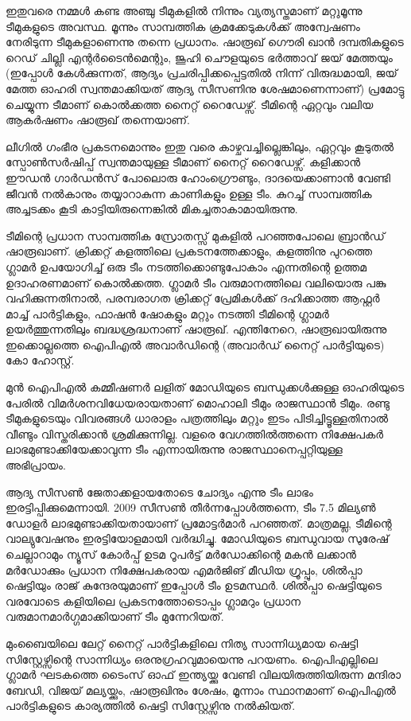 ഇതുവരെ നമ്മള്‍ കണ്ട അഞ്ചു ടീമുകളില്‍ നിന്നും വ്യത്യസ്തമാണ് മറ്റുമൂന്നു ടീമുകളുടെ അവസ്ഥ. മൂന്നും സാമ്പത്തിക 
ക്രമക്കേടുകള്‍ക്ക് അന്വേഷണം നേരിടുന്ന ടീമുകളാണെന്നു തന്നെ പ്രധാനം. ഷാരൂഖ് ഗൌരി ഖാന്‍ ദമ്പതികളുടെ റെഡ് 
ചില്ലി എന്റര്‍ടൈന്‍മെന്റും, ജൂഹി ചൌളയുടെ ഭര്‍ത്താവ് ജയ് മേത്തയും (ഇപ്പോള്‍ കേള്‍ക്കുന്നത്, ആദ്യം പ്രചരിപ്പിക്കപ്പെട്ടതില്‍ 
നിന്ന് വിരുദ്ധമായി, ജയ് മേത്ത ഓഹരി സ്വന്തമാക്കിയത് ആദ്യ സീസണിനു ശേഷമാണെന്നാണ്) പ്രമോട്ടു ചെയ്യുന്ന ടീമാണ് 
കൊല്‍ക്കത്ത നൈറ്റ് റൈഡേഴ്സ്. ടീമിന്റെ ഏറ്റവും വലിയ ആകര്‍ഷണം ഷാരൂഖ് തന്നെയാണ്.

ലീഗില്‍ ഗംഭീര പ്രകടനമൊന്നും ഇതു വരെ കാഴ്ചവച്ചില്ലെങ്കിലും, ഏറ്റവും കൂടുതല്‍ സ്പോണ്‍സര്‍ഷിപ്പ് സ്വന്തമായുള്ള ടീമാണ് 
നൈറ്റ് റൈഡേഴ്സ്. കളിക്കാന്‍ ഈഡന്‍ ഗാര്‍ഡന്‍സ് പോലൊരു ഹോംഗ്രൌണ്ടും, ദാദയെക്കാണാന്‍ വേണ്ടി ജീവന്‍ 
നല്‍കാനും തയ്യാറാകുന്ന കാണികളും ഉള്ള ടീം. കുറച്ച് സാമ്പത്തിക അച്ചടക്കം കൂടി കാട്ടിയിരുന്നെങ്കില്‍ മികച്ചതാകാമായിരുന്നു.

ടീമിന്റെ പ്രധാന സാമ്പത്തിക സ്രോതസ്സ് മുകളില്‍ പറഞ്ഞപോലെ ബ്രാന്‍ഡ് ഷാരൂഖാണ്. ക്രിക്കറ്റ് കളത്തിലെ 
പ്രകടനത്തേക്കാളും, കളത്തിനു പുറത്തെ ഗ്ലാമര്‍ ഉപയോഗിച്ച് ഒരു ടീം നടത്തിക്കൊണ്ടുപോകാം എന്നതിന്റെ ഉത്തമ 
ഉദാഹരണമാണ് കൊല്‍ക്കത്ത. ഗ്ലാമര്‍ ടീം വരുമാനത്തിലെ വലിയൊരു പങ്കു വഹിക്കുന്നതിനാല്‍, പരമ്പരാഗത ക്രിക്കറ്റ് 
പ്രേമികള്‍ക്ക് ദഹിക്കാത്ത ആഫ്റ്റര്‍ മാച്ച് പാര്‍ട്ടികളും, ഫാഷന്‍ ഷോകളും മറ്റും നടത്തി ടീമിന്റെ ഗ്ലാമര്‍ ഉയര്‍ത്തുന്നതിലും 
ബദ്ധശ്രദ്ധനാണ് ഷാരൂഖ്. എന്തിനേറെ, ഷാരൂഖായിരുന്നു ഇക്കൊല്ലത്തെ ഐപിഎല്‍ അവാര്‍ഡിന്റെ (അവാര്‍ഡ് 
നൈറ്റ് പാര്‍ട്ടിയുടെ) കോ ഹോസ്റ്റ്.

മുന്‍ ഐപിഎല്‍ കമ്മീഷണര്‍ ലളിത് മോഡിയുടെ ബന്ധുക്കള്‍ക്കുള്ള ഓഹരിയുടെ പേരില്‍ വിമര്‍ശനവിധേയരായതാണ് 
മൊഹാലി ടീമും രാജസ്ഥാന്‍ ടീമും. രണ്ടു ടീമുകളുടെയും വിവരങ്ങള്‍ ധാരാളം പത്രത്തിലും മറ്റും ഇടം പിടിച്ചിട്ടൂള്ളതിനാല്‍ വീണ്ടും 
വിസ്തരിക്കാന്‍ ശ്രമിക്കുന്നില്ല. വളരെ വേഗത്തില്‍ത്തന്നെ നിക്ഷേപകര്‍ ലാഭമുണ്ടാക്കിയേക്കാവുന്ന ടീം എന്നായിരുന്നു 
രാജസ്ഥാനെപ്പറ്റിയുള്ള അഭിപ്രായം.

ആദ്യ സീസണ്‍ ജേതാക്കളായതോടെ ചോദ്യം എന്നു ടീം ലാഭം ഇരട്ടിപ്പിക്കുമെന്നായി. 2009 സീസണ്‍ തീര്‍ന്നപ്പോള്‍ത്തന്നെ, 
ടീം 7.5 മില്യണ്‍ ഡോളര്‍ ലാഭമുണ്ടാക്കിയതായാണ് പ്രമോട്ടര്‍മാര്‍ പറഞ്ഞത്. മാത്രമല്ല, ടീമിന്റെ വാല്യുവേഷനും ഇരട്ടിയോളമായി 
വര്‍ദ്ധിച്ചു. മോഡിയുടെ ബന്ധുവായ സുരേഷ് ചെല്ലാറാമും ന്യൂസ് കോര്‍പ്പ് ഉടമ റൂപര്‍ട്ട് മര്‍ഡോക്കിന്റെ മകന്‍ ലക്കാന്‍ 
മര്‍ഡോക്കും പ്രധാന നിക്ഷേപകരായ എമര്‍ജിങ് മീഡിയ ഗ്രൂപ്പും, ശില്‍പ്പാ ഷെട്ടിയും രാജ് കുന്ദേരയുമാണ് ഇപ്പോള്‍ ടീം 
ഉടമസ്ഥര്‍. ശില്‍പ്പാ ഷെട്ടിയുടെ വരവോടെ കളിയിലെ പ്രകടനത്തോടൊപ്പം ഗ്ലാമറും പ്രധാന വരുമാനമാര്‍ഗ്ഗമാക്കിയാണ് 
ടീം മുന്നേറിയത്.

മുംബൈയിലെ ലേറ്റ് നൈറ്റ് പാര്‍ട്ടികളിലെ നിത്യ സാന്നിധ്യമായ ഷെട്ടി സിസ്റ്റേഴ്സിന്റെ സാന്നിധ്യം ഒരനുഗ്രഹവുമായെന്നു 
പറയണം. ഐപിഎല്ലിലെ ഗ്ലാമര്‍ ഘടകത്തെ ടൈംസ് ഓഫ് ഇന്ത്യയ്ക്കു വേണ്ടി വിലയിരുത്തിയിരുന്ന മന്ദിരാ ബേഡി, 
വിജയ് മല്യയ്ക്കും, ഷാരൂഖിനും ശേഷം, മൂന്നാം സ്ഥാനമാണ് ഐപിഎല്‍ പാര്‍ട്ടികളുടെ കാര്യത്തില്‍ ഷെട്ടി സിസ്റ്റേഴ്സിനു 
നല്‍കിയത്.

